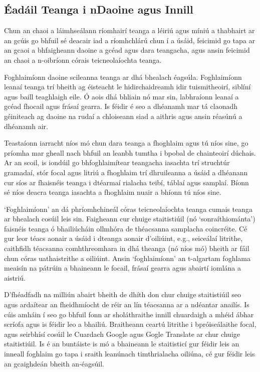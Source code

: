 \documentclass[]{../../metanetpaper}
\begin{document}
\begin{multicols}{2}

\subsection{Éadáil Teanga i nDaoine agus Innill}

Chun an chaoi a láimhseálann ríomhairí teanga a léiriú agus míniú a thabhairt ar an gcúis go bhfuil sé deacair iad a ríomhchlárú chun í a úsáid, feicimid go tapa ar an gcaoi a bhfaigheann daoine a gcéad agus dara teangacha, agus ansin feicimid an chaoi a n-oibríonn córais teicneolaíochta teanga.


Foghlaimíonn daoine scileanna teanga ar dhá bhealach éagsúla. Foghlaimíonn leanaí teanga trí bheith ag éisteacht le hidirchaidreamh idir tuismitheoirí, siblíní agus baill teaghlaigh eile. Ó aois dhá bhliain nó mar sin, labhraíonn leanaí a gcéad fhocail agus frásaí gearra. Is féidir é seo a dhéanamh mar tá claonadh géiniteach ag daoine na rudaí a chloiseann siad a aithris agus ansin réasúnú a dhéanamh air. 

Teastaíonn iarracht níos mó chun dara teanga a fhoghlaim agus tú níos sine, go príomha mar gheall nach bhfuil an leanbh tumtha i bpobal de chainteoirí dúchais. Ar an scoil, is iondúil go bhfoghlaimítear teangacha iasachta trí struchtúr gramadaí, stór focal agus litriú a fhoghlaim trí dhruileanna a úsáid a dhéanann cur síos ar fhaisnéis teanga i dtéarmaí rialacha teibí, táblaí agus samplaí. Bíonn sé níos deacra teanga iasachta a fhoghlaim nuair a bhíonn tú níos sine. 

`Foghlaimíonn' an dá phríomhchineál córas teicneolaíochta teanga cumais teanga ar bhealach cosúil leis sin. Faigheann cur chuige staitistiúil (nó ‘sonraíthiománta’) faisnéis teanga ó bhailiúcháin ollmhóra de théacsanna samplacha coincréite. Cé gur leor téacs aonair a úsáid i dteanga aonair d'oiliúint, e.g., seiceálaí litrithe, caithfidh téacsanna comhthreomhara in dhá theanga (nó níos mó) bheith ar fáil chun córas uathaistrithe a oiliúint. Ansin `foghlaimíonn' an t-algartam foghlama meaisín na pátrúin a bhaineann le focail, frásaí gearra agus abairtí iomlána a aistriú. 

D’fhéadfadh na milliún abairt bheith de dhíth don chur chuige staitistiúil seo agus ardaítear an fheidhmíocht de réir an lín téacsanna ar a ndéantar anailís. Is cúis amháin í seo go bhfuil fonn ar sholáthraithe innill chuardaigh a mhéid ábhar scríofa agus is féidir leo a bhailiú. Braitheann ceartú litrithe i bpróiseálaithe focal, agus seirbhísí cosúil le Cuardach Google agus Gogle Translate ar chur chuige staitistiúil. Is é an buntáiste is mó a bhaineann le staitisticí gur féidir leis an inneall foghlaim go tapa i sraith leanúnach timthrialacha oiliúna, cé gur féidir leis an gcaighdeán bheith an-éagsúil.


\end{multicols}
\end{document}
